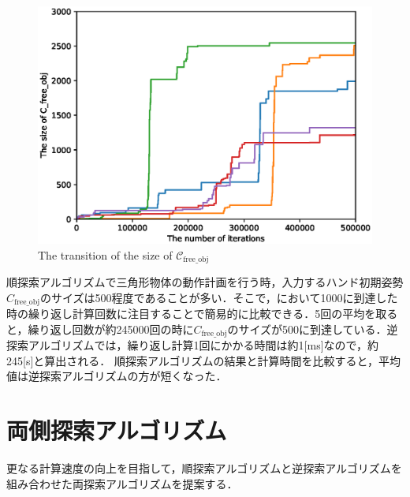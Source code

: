 \documentclass[a4paper,twoside,12pt,papersize, dvipdfmx]{iirthesis}
\begin{document}
\begin{figure}[b]
\centering
\includegraphics[width=0.6\hsize]{fig/3-new-planner/transition.eps}
\caption{The transition of the size of $\mathcal{C}_{\mathrm{free\_obj}}$}\label{fig::planner::revrrtres}
\end{figure}
順探索アルゴリズムで三角形物体の動作計画を行う時，入力するハンド初期姿勢$C_{\mathrm{free\_obj}}$のサイズは500程度であることが多い．そこで，において1000に到達した時の繰り返し計算回数に注目することで簡易的に比較できる．5回の平均を取ると，繰り返し回数が約245000回の時に$C_{\mathrm{free\_obj}}$のサイズが500に到達している．逆探索アルゴリズムでは，繰り返し計算1回にかかる時間は約1[ms]なので，約245[s]と算出される．
順探索アルゴリズムの結果と計算時間を比較すると，平均値は逆探索アルゴリズムの方が短くなった．


\section{両側探索アルゴリズム}\label{sec::planner::connect}
更なる計算速度の向上を目指して，順探索アルゴリズムと逆探索アルゴリズムを組み合わせた両探索アルゴリズムを提案する．
\end{document}
